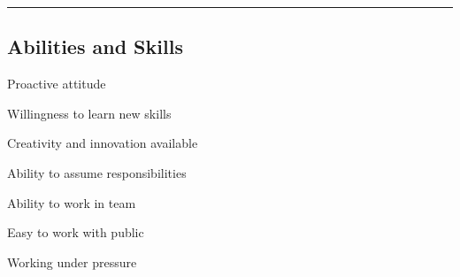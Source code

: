 \documentclass[10pt,letterpaper]{article}
\newenvironment{indentsection}[1]%
{\begin{list}{}%
	{\setlength{\leftmargin}{#1}}%
	\item[]%
}
{\end{list}}
\begin{document}

\hrule
\vspace{-0.4em}
\subsection*{Abilities and Skills}

\begin{indentsection}{\parindent}
\begin{description*}

\item
  Proactive attitude
\item
  Willingness to learn new skills
\item
  Creativity and innovation available
\item
  Ability to assume responsibilities
\item
  Ability to work in team
\item
  Easy to work with public
\item
  Working under pressure

\end{description*}
\end{indentsection}
\end{document}
